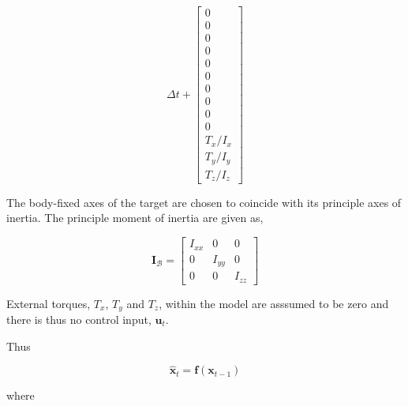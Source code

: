 \begin{equation}
    \Delta t + 
    \begin{bmatrix}
        0 \\
        0 \\
        0 \\
        0 \\
        0 \\
        0 \\
        0 \\
        0 \\
        0 \\
        0 \\
        \mathit{T}_x/\mathit{I}_x \\
        \mathit{T}_y/\mathit{I}_y \\
        \mathit{T}_z/\mathit{I}_z
    \end{bmatrix}
\end{equation}

\noindent
The body-fixed axes of the target are chosen to coincide with its principle axes of inertia. The principle moment of inertia are given as,

\begin{equation}
    \mathbf{I}_\mathcal{B} = 
    \begin{bmatrix}
        \mathit{I}_{xx} & 0 & 0 \\
        0 & \mathit{I}_{yy} & 0 \\
        0 & 0 & \mathit{I}_{zz}
    \end{bmatrix}
\end{equation}

\noindent
External torques, $\mathit{T}_x$, $\mathit{T}_y$ and $\mathit{T}_z$, within the model are asssumed to be zero and there is thus no control input, $\mathbf{u}_t$. 
\vspace{0.5cm}

\noindent
Thus 

\begin{equation}
    \mathbf{\hat{x}}_t = \mathbf{f}(\mathbf{x}_{t-1})
\end{equation}

\noindent
where

